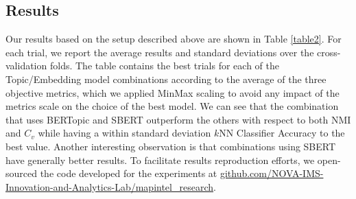 \documentclass[a4paper]{article}
\begin{document}
\subsection{Results}
Our results based on the setup described above are shown in Table \ref{table2}. For each trial, we report the average results and standard deviations over the cross-validation folds. The table contains the best trials for each of the Topic/Embedding model combinations according to the average of the three objective metrics, which we applied MinMax scaling to avoid any impact of the metrics scale on the choice of the best model. We can see that the combination that uses BERTopic and SBERT outperform the others with respect to both NMI and $C_v$ while having a within standard deviation $k$NN Classifier Accuracy to the best value. Another interesting observation is that combinations using SBERT have generally better results. To facilitate results reproduction efforts, we open-sourced the code developed for the experiments at \href{https://github.com/NOVA-IMS-Innovation-and-Analytics-Lab/mapintel_research}{github.com/NOVA-IMS-Innovation-and-Analytics-Lab/mapintel\_research}.

\begin{table}[H]
  \centering
  \caption{Hyperparameter tuning best trials per topic and embedding model according to the MinMax average of the multiple objective metrics.}
  \label{table2}
\end{table}
\end{document}
